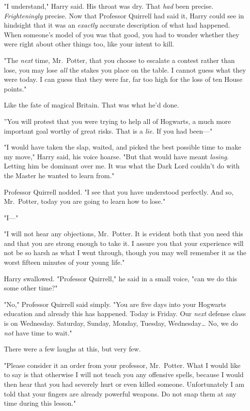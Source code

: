 "I understand," Harry said. His throat was dry. That \emph{had} been precise. 
\emph{Frighteningly} precise. Now that Professor Quirrell had said it, Harry 
could see in hindsight that it was an \emph{exactly} accurate description of 
what had happened. When someone's model of you was that good, you had to wonder 
whether they were right about other things too, like your intent to kill.

"The \emph{next} time, Mr.~Potter, that you choose to escalate a contest rather 
than lose, you may lose \emph{all} the stakes you place on the table. I cannot 
guess what they were today. I can guess that they were far, far too high for 
the loss of ten House points."

Like the fate of magical Britain. That was what he'd done.

''You will protest that you were trying to help all of Hogwarts, a much more 
important goal worthy of great risks. That is a \emph{lie.} If you had been---"

"I would have taken the slap, waited, and picked the best possible time to make 
my move," Harry said, his voice hoarse. "But that would have meant 
\emph{losing}. Letting him be dominant over me. It was what the Dark Lord 
couldn't do with the Master he wanted to learn from."

Professor Quirrell nodded. "I see that you have understood perfectly. And so, 
Mr.~Potter, today you are going to learn how to lose."

"I---"

"I will not hear any objections, Mr.~Potter. It is evident both that you need 
this and that you are strong enough to take it. I assure you that your 
experience will not be so harsh as what I went through, though you may well 
remember it as the worst fifteen minutes of your young life."

Harry swallowed. "Professor Quirrell," he said in a small voice, "can we do 
this some other time?"

"No," Professor Quirrell said simply. "You are five days into your Hogwarts 
education and already this has happened. Today is Friday. Our \emph{next} 
defense class is on Wednesday. Saturday, Sunday, Monday, Tuesday, 
Wednesday{\ldots} No, we do \emph{not} have time to wait."

There were a few laughs at this, but very few.

"Please consider it an order from your professor, Mr.~Potter. What I would like 
to say is that otherwise I will not teach you any offensive spells, because I 
would then hear that you had severely hurt or even killed someone. 
Unfortunately I am told that your fingers are already powerful weapons. Do not 
snap them at any time during this lesson."

